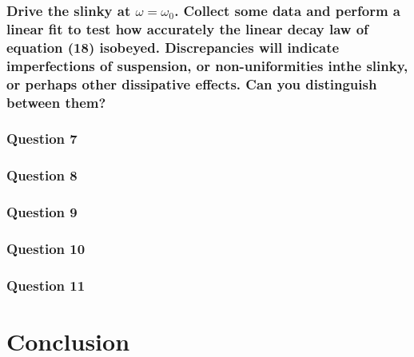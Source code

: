 \documentclass{article}
\begin{document}
\subsubsection*{Drive the slinky at $\omega=\omega_{0}$.  Collect  some  data  and perform  a  linear  fit  to  test  how  accurately  the  linear  decay  law  of  equation  (18)  isobeyed.  Discrepancies will indicate imperfections of suspension, or non-uniformities inthe slinky, or perhaps other dissipative effects.  Can you distinguish between them?}

\subsubsection*{Question 7}


\subsubsection*{Question 8}

\subsubsection*{Question 9}

\subsubsection*{Question 10}

\subsubsection*{Question 11}

\newpage
\section{Conclusion}
\end{document}
